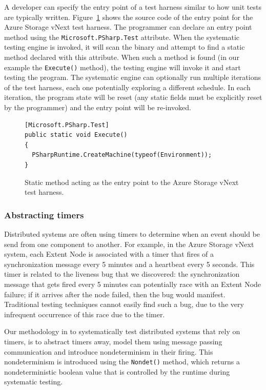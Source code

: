A developer can specify the entry point of a \psharp test harness similar to how unit tests are typically written. Figure~\ref{fig:entrypoint} shows the source code of the entry point for the Azure Storage vNext \psharp test harness. The programmer can declare an entry point method using the \texttt{Microsoft.PSharp.Test} attribute. When the \psharp systematic testing engine is invoked, it will scan the binary and attempt to find a static method declared with this attribute. When such a method is found (in our example the \texttt{Execute()} method), the testing engine will invoke it and start testing the program. The systematic engine can optionally run multiple iterations of the test harness, each one potentially exploring a different schedule. In each iteration, the program state will be reset (any static fields must be explicitly reset by the programmer) and the entry point will be re-invoked.

\begin{figure}[t]
\begin{lstlisting}
[Microsoft.PSharp.Test]
public static void Execute()
{
  PSharpRuntime.CreateMachine(typeof(Environment));
}
\end{lstlisting}
\vspace{-2mm}
\caption{Static \csharp method acting as the entry point to the Azure Storage vNext \psharp test harness.}
\label{fig:entrypoint}
\end{figure}

\subsubsection{Abstracting timers}
\label{sec:method:model:timers}

Distributed systems are often using timers to determine when an event should be send from one component to another. For example, in the Azure Storage vNext system, each Extent Node is associated with a timer that fires of a synchronization message every 5 minutes and a heartbeat every 5 seconds. This timer is related to the liveness bug that we discovered: the synchronization message that gets fired every 5 minutes can potentially race with an Extent Node failure; if it arrives after the node failed, then the bug would manifest. Traditional testing techniques cannot easily find such a bug, due to the very infrequent occurrence of this race due to the timer. 

Our methodology in \psharp to systematically test distributed systems that rely on timers, is to abstract timers away, model them using message passing communication and introduce nondeterminism in their firing. This nondeterminism is introduced using the \psharp \texttt{Nondet()} method, which returns a nondeterministic boolean value that is controlled by the \psharp runtime during systematic testing.

